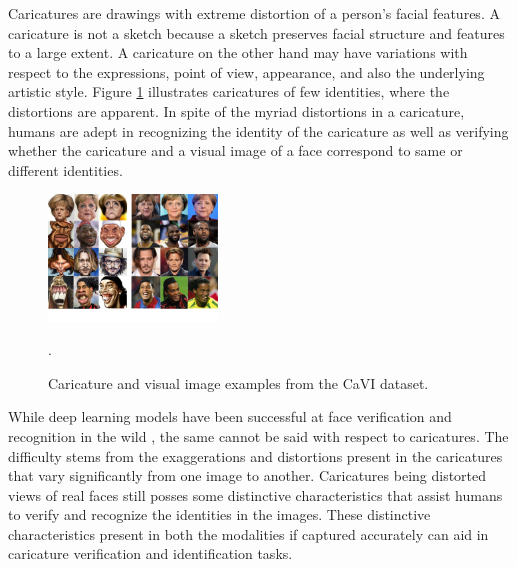 Caricatures are drawings with extreme distortion of a person's facial features. A caricature is not a sketch because a sketch preserves facial structure and features to a large extent. A caricature on the other hand may have variations with respect to the expressions, point of view, appearance, and also the underlying artistic style. Figure \ref{fig:dataset} illustrates caricatures of few identities, where the distortions are apparent. In spite of the myriad distortions in a caricature, humans are adept in recognizing the identity of the caricature as well as verifying whether the caricature and a visual image of a face correspond to same or different identities. 
\begin{figure}[h]
\centering
\includegraphics[width=0.4\textwidth]{images/dataset.jpg}
\caption{Caricature and visual image examples from the CaVI dataset.}.
\label{fig:dataset}
\end{figure}

While deep learning models have been successful at face verification and recognition in the wild \cite{Facenet, Parkhi15}, the same cannot be said with respect to caricatures. The difficulty stems from the exaggerations and distortions present in the caricatures that vary significantly from one image to another. Caricatures being distorted views of real faces still posses some distinctive characteristics that assist humans to verify and recognize the identities in the images. These distinctive characteristics present in both the modalities if captured accurately can aid in caricature verification and identification tasks. %


